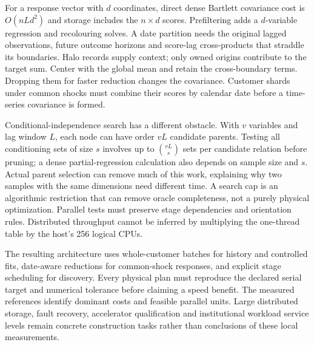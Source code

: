 For a response vector with $d$ coordinates, direct dense Bartlett covariance
cost is $O(nLd^2)$ and storage includes the $n\times d$ scores. Prefiltering
adds a $d$-variable regression and recolouring solves. A date partition needs
the original lagged observations, future outcome horizons and score-lag
cross-products that straddle its boundaries. Halo records supply context;
only owned origins contribute to the target sum. Center with the global
mean and retain the cross-boundary terms. Dropping them for faster reduction
changes the covariance. Customer shards under common shocks must combine
their scores by calendar date before a time-series covariance is formed.

Conditional-independence search has a different obstacle. With $v$ variables
and lag window $L$, each node can have order $vL$ candidate parents. Testing
all conditioning sets of size $s$ involves up to
$\binom{vL}{s}$ sets per candidate relation before pruning; a dense
partial-regression calculation also depends on sample size and $s$.
Actual parent selection can remove much of this work, explaining why two
samples with the same dimensions need different time. A search cap is an
algorithmic restriction that can remove oracle completeness, not a purely
physical optimization. Parallel tests must preserve stage dependencies and
orientation rules. Distributed throughput cannot be inferred by multiplying
the one-thread table by the host's 256 logical CPUs.

The resulting architecture uses whole-customer batches for history and
controlled fits, date-aware reductions for common-shock responses, and
explicit stage scheduling for discovery. Every physical plan must reproduce
the declared serial target and numerical tolerance before claiming a speed
benefit. The measured references identify dominant costs and feasible
parallel units. Large distributed storage, fault recovery, accelerator
qualification and institutional workload service levels remain concrete
construction tasks rather than conclusions of these local measurements.
